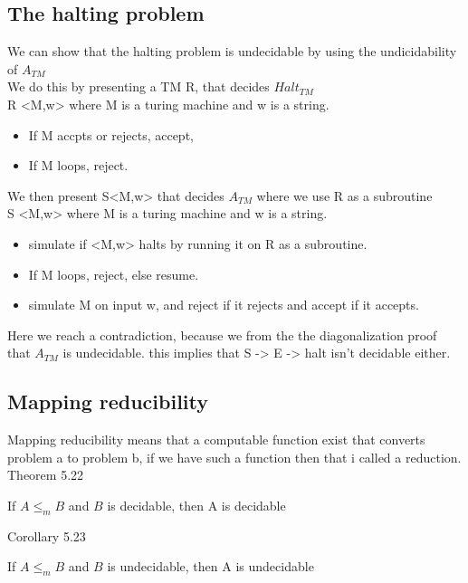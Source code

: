 \documentclass[a4paper,10pt,titlepage]{report}
\begin{document}
\subsection{The halting problem}

We can show that the halting problem is undecidable by using the undicidability of $A_{TM}$\\

We do this by presenting a TM R, that decides $Halt_{TM}$\\

R <M,w> where M is a turing machine and w is a string.
\begin{itemize}
	\item If M accpts or rejects, accept,
	\item If M loops, reject.
\end{itemize}


We then present S<M,w> that decides $A_{TM}$ where we use R as a subroutine\\

S <M,w> where M is a turing machine and w is a string.
\begin{itemize}
	\item simulate if <M,w> halts by running it on R as a subroutine. 
	\item If M loops, reject, else resume.
	\item simulate M on input w, and reject if it rejects and accept if it accepts.
\end{itemize}

Here we reach a contradiction, because we from the the diagonalization proof that $A_{TM}$ is undecidable. this implies that S -> E -> halt isn't decidable either.

\subsection{Mapping reducibility}

Mapping reducibility means that a computable function exist that converts problem a to problem b, if we have such a function then that i called a reduction.\\

Theorem 5.22\\
\begin{center}
If $A \leq_m B $ and $ B $ is decidable, then A is decidable 
\end{center}

Corollary 5.23\\
\begin{center}
If $A \leq_m B $ and $ B $ is undecidable, then A is undecidable 
\end{center}
\end{document}
